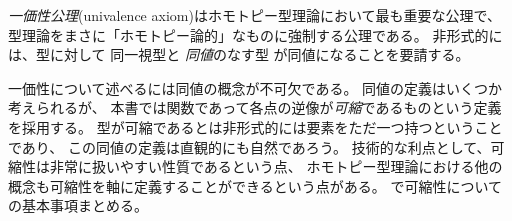 \documentclass[index]{subfiles}
\begin{document}

\emph{一価性公理}(univalence axiom)はホモトピー型理論において最も重要な公理で、
型理論をまさに「ホモトピー論的」なものに強制する公理である。
非形式的には、型に対して
同一視型と
\emph{同値}のなす型
が同値になることを要請する。

一価性について述べるには同値の概念が不可欠である。
同値の定義はいくつか考えられるが、
本書では関数であって各点の逆像が\emph{可縮}であるものという定義を採用する。
型が可縮であるとは非形式的には要素をただ一つ持つということであり、
この同値の定義は直観的にも自然であろう。
技術的な利点として、可縮性は非常に扱いやすい性質であるという点、
ホモトピー型理論における他の概念も可縮性を軸に定義することができるという点がある。
で可縮性についての基本事項まとめる。

\begin{mySubsections}
  
  
  
  
  
  
\end{mySubsections}
\end{document}
